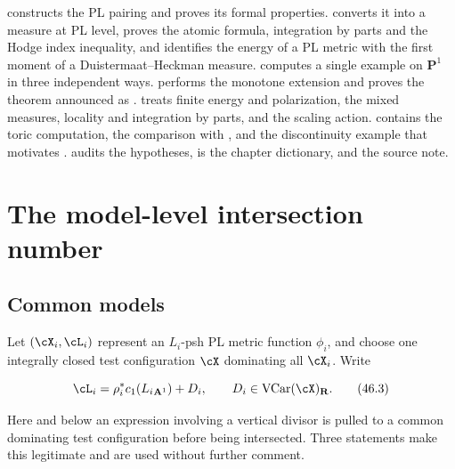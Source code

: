  constructs the PL pairing and proves its formal
properties.   converts it into a measure at PL
level, proves the atomic formula, integration by parts and the Hodge index
inequality, and identifies the energy of a PL metric with the first moment
of a Duistermaat--Heckman measure.   computes a single
example on $\mathbf P^1$ in three independent ways.
 performs the monotone extension and proves the
theorem announced as .
 treats finite energy and polarization,
 the mixed measures,  locality and
integration by parts, and  the scaling action.
 contains the toric computation, the comparison
with , and the discontinuity example that motivates
.   audits the
hypotheses,  is the chapter dictionary, and
 the source note.

\section{The model-level intersection number}
\label{sec:ch46-model}

\subsection{Common models}
\label{sec:ch46-common-models}

Let $(\cX_i,\cL_i)$ represent an $L_i$-psh PL metric
function $\phi_i$, and choose one integrally closed test configuration
$\cX$ dominating all $\cX_i$.  Write

\[
 \cL_i=\rho_i^*c_1(L_i{}_{\mathbf A^1})+D_i,
 \qquad D_i\in\operatorname{VCar}(\cX)_{\mathbf R}.
\tag{46.3}\label{eq:bj-common-model-pairs}
\]

Here and below an expression involving a vertical divisor is pulled to a
common dominating test configuration before being intersected.  Three
statements make this legitimate and are used without further comment.

